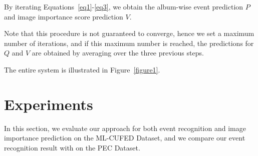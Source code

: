 \documentclass[runningheads]{llncs}
\begin{document}
\begin{enumerate}
%
%
%
%
%
\end{enumerate}

By iterating Equations~\ref{eq1}-\ref{eq3}, we obtain the album-wise event prediction $P$ and image importance score prediction $V$. 

Note that this procedure is not guaranteed to converge, hence we set a maximum number of iterations, and if this maximum number is reached, the predictions for $Q$ and $V$ are obtained by averaging over the three previous steps.

The entire system is illustrated in Figure~\ref{figure1}.

\section{Experiments}
In this section, we evaluate our approach for both event recognition and image importance prediction on the ML-CUFED Dataset, and we compare our event recognition result with \cite{HMM} on the PEC Dataset.
\end{document}

